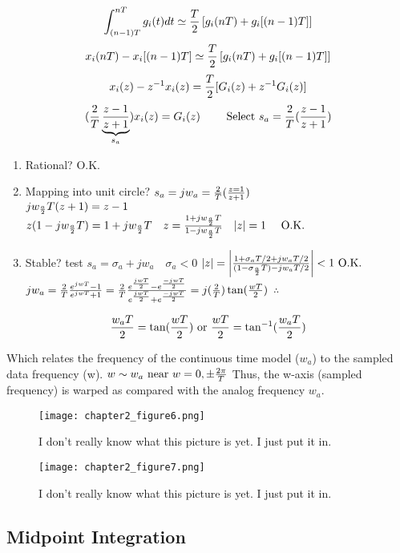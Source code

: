 \documentclass[11pt,fleqn]{book} %
\begin{document}
$$\int_{(n-1)T}^{nT}g_i(t)dt\simeq{T\over 2}\left[g_i(nT)+g_i[(n-1)T]\right]$$
$$x_i(nT)-x_i[(n-1)T]\simeq{T\over 2}\left[g_i(nT)+g_i[(n-1)T]\right]$$
$$x_i(z)-z^{-1}x_i(z)={T\over 2}[G_i(z)+z^{-1}G_i(z)]$$
$$({2\over T}\underbrace{z-1\over z+1}_{s_a})x_i(z)=G_i(z)\qquad \text{ Select }s_a={2\over T}({z-1\over z+1})$$
\begin{enumerate}
 \item Rational? O.K.
 \item Mapping into unit circle? $s_a=jw_a={2\over T}({z=1\over z+1})$\\
  $jw_{a\over 2}T(z+1)=z-1$\\
  $z(1-jw_{a\over 2}T)=1+jw_{a\over 2}T\quad z={1+jw_{a\over 2}T\over 1-jw_{a\over 2}T} \quad |z|=1 \quad\text{ O.K.}$
  \item Stable? test $s_a=\sigma_a+jw_a\quad\sigma_a<0$
$|z|=\left|{1+\sigma_aT/2+jw_aT/2\over(1-\sigma_{a\over 2}T)-jw_aT/2}\right|<1 \text{ O.K.}$
$jw_a={2\over T}{e^{jwT}-1\over e^{jwT}+1}={2\over T}{e^{jwT\over 2}-e^{-jwT\over 2}\over e^{jwT\over 2}+e^{-jwT\over 2}}=j({2\over T})\tan({wT\over 2})$
$\therefore$
\end{enumerate}
\begin{tcolorbox}
  $${{w_aT\over 2}=\tan({wT\over 2})\text{ or }{wT\over 2}=\tan^{-1}({w_aT\over 2})}$$
\end{tcolorbox}
Which relates the frequency of the continuous time model ($w_a$) to the sampled data frequency (w).
$w\sim w_a\text{ near }w=0,\pm{2\pi\over T}$
Thus, the w-axis (sampled frequency) is warped as compared with the analog frequency $w_a$.

\begin{figure}[h]
  \centering\texttt{[image: chapter2\_figure6.png]}
  \caption{I don't really know what this picture is yet. I just put it in.}
\end{figure}

\begin{figure}[h]
  \centering\texttt{[image: chapter2\_figure7.png]}
  \caption{I don't really know what this picture is yet. I just put it in.}
\end{figure}

\subsection{Midpoint Integration}
\end{document}
